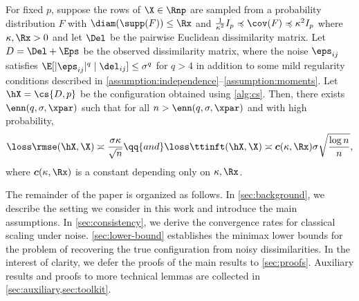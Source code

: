 \documentclass[10pt]{article}
\begin{document}
\begingroup
\renewcommand*{\thecorollary}{\!\!\!\:}
\begin{corollary}
    For fixed $p$, suppose the rows of $\X \in \Rnp$ are sampled \iid{} from a probability distribution $F$ with $\diam(\supp(F)) \le \Rx$ and $\frac{1}{\kappa^2}I_p \preccurlyeq \cov(F) \preccurlyeq \kappa^2 I_p$ where $\kappa, \Rx > 0$ and let $\Del$ be the pairwise Euclidean dissimilarity matrix. Let $D = \Del + \Eps$ be the observed dissimilarity matrix, where the noise $\eps_{ij}$ satisfies $\E[|\eps_{ij}|^q \mid \del_{ij}] \le \sigma^q$ for $q > 4$ in addition to some mild regularity conditions described in \ref{assumption:independence}--\ref{assumption:moments}. Let $\hX = \cs{D, p}$ be the configuration obtained using \cref{alg:cs}. Then, there exists $\enn(q, \sigma, \xpar)$ such that for all $n > \enn(q, \sigma, \xpar)$ and with high probability,
    \begin{align}
        \loss\rmse(\hX, \X) \asymp \frac{\sigma\kappa}{\sqrt{n}} \qq{and} \loss\ttinft(\hX, \X) \asymp \boldsymbol{c}(\kappa, \Rx) \sigma \sqrt{\frac{\log{n}}{{n}}},\label{eq:main-result}
    \end{align}
    where $\boldsymbol{c}(\kappa, \Rx)$ is a constant depending only on $\kappa, \Rx$.
\end{corollary}
\endgroup

The remainder of the paper is organized as follows. In \cref{sec:background}, we describe the setting we consider in this work and introduce the main assumptions. In \cref{sec:consistency}, we derive the convergence rates for classical scaling under noise. \cref{sec:lower-bound} establishes the minimax lower bounds for the problem of recovering the true configuration from noisy dissimilarities. In the interest of clarity, we defer the proofs of the main results to \cref{sec:proofs}. Auxiliary results and proofs to more technical lemmas are collected in \cref{sec:auxiliary,sec:toolkit}.
\end{document}
